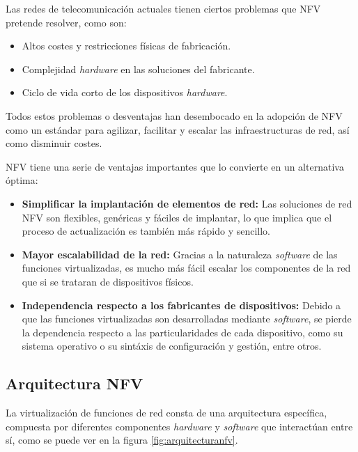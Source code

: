 Las redes de telecomunicación actuales tienen ciertos problemas que NFV pretende resolver, como son:

\begin{itemize}
	\item Altos costes y restricciones físicas de fabricación.
	\item Complejidad \textit{hardware} en las soluciones del fabricante.
	\item Ciclo de vida corto de los dispositivos \textit{hardware}.
\end{itemize}

Todos estos problemas o desventajas han desembocado en la adopción de NFV como un estándar para agilizar, facilitar y escalar las infraestructuras de red, así como disminuir costes.

NFV tiene una serie de ventajas importantes que lo convierte en un alternativa óptima:

\begin{itemize}
	\item \textbf{Simplificar la implantación de elementos de red:} Las soluciones de red NFV son flexibles, genéricas y fáciles de implantar, lo que implica que el proceso de actualización es también más rápido y sencillo.
	
	\item \textbf{Mayor escalabilidad de la red:} Gracias a la naturaleza \textit{software} de las funciones virtualizadas, es mucho más fácil escalar los componentes de la red que si se trataran de dispositivos físicos.
	
	\item \textbf{Independencia respecto a los fabricantes de dispositivos:} Debido a que las funciones virtualizadas son desarrolladas mediante \textit{software}, se pierde la dependencia respecto a las particularidades de cada dispositivo, como su sistema operativo o su sintáxis de configuración y gestión, entre otros.
\end{itemize}

\subsection{Arquitectura NFV}
\label{subsec:nfvarq}

La virtualización de funciones de red consta de una arquitectura específica, compuesta por diferentes componentes \textit{hardware} y \textit{software} que interactúan entre sí, como se puede ver en la figura \ref{fig:arquitecturanfv}.

